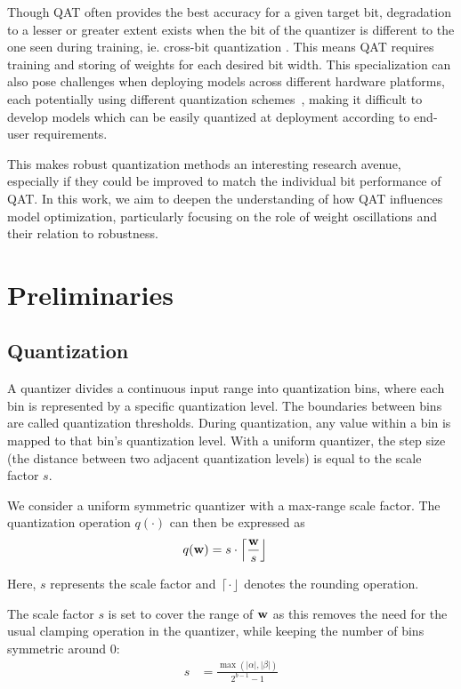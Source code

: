 Though QAT often provides the best accuracy for a given target bit, degradation to a lesser or greater extent exists when the bit of the quantizer is different to the one seen during training, ie. cross-bit quantization \cite{alizadeh2020gradient, OneModelRobust}. This means QAT requires training and storing of weights for each desired bit width. This specialization can also pose challenges when deploying models across different hardware platforms, each potentially using different quantization schemes~\cite{inferenceBenchmark}, making it difficult to develop models which can be easily quantized at deployment according to end-user requirements.

This makes robust quantization methods an interesting research avenue, especially if they could be improved to match the individual bit performance of QAT. In this work, we aim to deepen the understanding of how QAT influences model optimization, particularly focusing on the role of weight oscillations and their relation to robustness. 

\section{Preliminaries}
\subsection{Quantization}
A quantizer divides a continuous input range into quantization bins, where each bin is represented by a specific quantization level. The boundaries between bins are called quantization thresholds. During quantization, any value within a bin is mapped to that bin's quantization level. With a uniform quantizer, the step size (the distance between two adjacent quantization levels) is equal to the scale factor $s$.

We consider a uniform symmetric quantizer with a max-range scale factor. The quantization operation $q(\cdot)$ can then be expressed as
\begin{align}
    q(\mathbf{w}) &= s \cdot \left\lceil \frac{\mathbf{w}}{s} \right\rfloor
    \label{eq:quantizer}
\end{align}

Here, $s$ represents the scale factor and $\left\lceil \cdot \right\rfloor$ denotes the rounding operation.

The scale factor $s$ is set to cover the range of $\mathbf{w}$ as this removes the need for the usual clamping operation in the quantizer, while keeping the number of bins symmetric around 0:
\begin{align}
    s &= \frac{\max(\lvert \alpha \rvert, \lvert \beta \rvert)}{2^{b-1}-1}
    \label{eq:scale_factor}
\end{align} 

